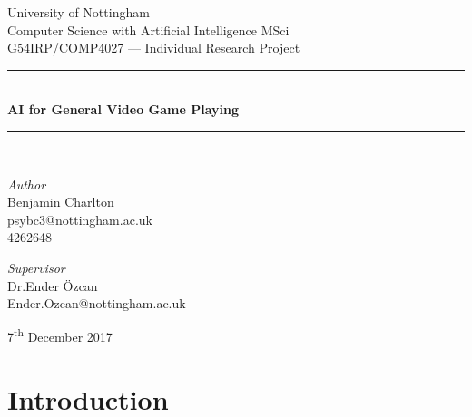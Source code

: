 \documentclass[a4paper]{article}
\begin{document}
\begin{titlepage}
	\newcommand{\HRule}{\rule{\linewidth}{0.5mm}}
	\center{}

	\LARGE{University of Nottingham}\\[1.5cm]
	\Large{Computer Science with Artificial Intelligence MSci}\\[0.5cm]
	\large{G54IRP/COMP4027 --- Individual Research Project}\\[0.5cm]

	\HRule{}\\[0.4cm]
	{\huge\bfseries AI for General Video Game Playing}\\[0.4cm]
	\HRule{}\\[1.5cm]

	\begin{minipage}{0.4\textwidth}
		\begin{flushleft}
			\large
			\textit{Author}\\
			Benjamin Charlton\\
            psybc3@nottingham.ac.uk\\
            4262648
		\end{flushleft}
	\end{minipage}
    \begin{minipage}{0.4\textwidth}
		\begin{flushright}
			\large
			\textit{Supervisor}\\
			Dr.\@ Ender \"Ozcan\\
            Ender.Ozcan@nottingham.ac.uk
		\end{flushright}
	\end{minipage}

	\vfill\vfill\vfill
	{\large7\textsuperscript{th} December 2017}
	\vfill

\end{titlepage}

\tableofcontents
\pagebreak

\section{Introduction}
\end{document}

